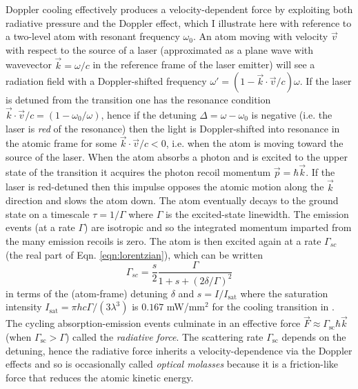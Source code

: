 	Doppler cooling effectively produces a velocity-dependent force by exploiting both radiative pressure and the Doppler effect, which I illustrate here with reference to a two-level atom with resonant frequency $\omega_0$.
	An atom moving with velocity $\vec{v}$ with respect to the source of a laser (approximated as a plane wave with wavevector $\vec{k} = \omega/c$ in the reference frame of the laser emitter) will see a radiation field with a Doppler-shifted frequency $\omega' = (1 - \vec{k}\cdot \vec{v}/c)\omega$.
	If the laser is detuned from the transition one has the resonance condition $\vec{k} \cdot \vec{v}/c = (1 - \omega_0/\omega)$, hence if the detuning $\Delta = \omega-\omega_0$ is negative (i.e. the laser is \emph{red} of the resonance) then the light is Doppler-shifted into resonance in the atomic frame for some $\vec{k} \cdot \vec{v}/c<0$, i.e. when the atom is moving toward the source of the laser. 
	When the atom absorbs a photon and is excited to the upper state of the transition it acquires the photon recoil momentum $\vec{p} = \hbar \vec{k}$.
	If the laser is red-detuned then this impulse opposes the atomic motion along the $\vec{k}$ direction and slows the atom down.
	The atom eventually decays to the ground state on a timescale $\tau = 1/\Gamma$ where $\Gamma$ is the excited-state linewidth.
	The emission events (at a rate $\Gamma$) are isotropic and so the integrated momentum imparted from the many emission recoils is zero.
	The atom is then excited again at a rate $\Gamma_{sc}$ (the real part of Eqn. \ref{eqn:lorentzian}), which can be written 
	\begin{equation}
		\Gamma_{sc} = \frac{s}{2 }\frac{\Gamma}{1 + s + (2\delta/\Gamma)^2}
	\end{equation}	
	in terms of the (atom-frame) detuning $\delta$ and $s=I/I_\textrm{sat}$ where the saturation intensity $I_\textrm{sat} = \pi h c \Gamma/(3\lambda^3)$ is $0.167$ mW/mm$^2$ for the cooling transition in \mhe \cite{BaldwinReview}.
	The cycling absorption-emission events culminate in an effective force $\vec{F} \approx \Gamma_\textrm{sc}\hbar\vec{k}$ (when $\Gamma_\textrm{sc}>\Gamma$) called the \emph{radiative force}. 
	The scattering rate $\Gamma_\textrm{sc}$ depends on the detuning, hence the radiative force inherits a velocity-dependence via the Doppler effects and so is occasionally called \emph{optical molasses} because it is a friction-like force that reduces the atomic kinetic energy.

